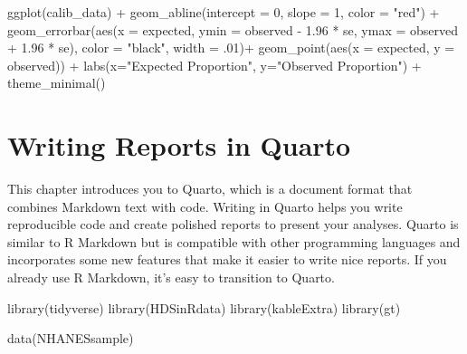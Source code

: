 \documentclass[
  letterpaper,
]{latex/krantz}
\makeatletter
\newenvironment{Shaded}{\begin{snugshade}}{\end{snugshade}}
\newcommand{\AttributeTok}[1]{\textcolor[rgb]{0.40,0.45,0.13}{#1}}
\newcommand{\DecValTok}[1]{\textcolor[rgb]{0.68,0.00,0.00}{#1}}
\newcommand{\FloatTok}[1]{\textcolor[rgb]{0.68,0.00,0.00}{#1}}
\newcommand{\FunctionTok}[1]{\textcolor[rgb]{0.28,0.35,0.67}{#1}}
\newcommand{\NormalTok}[1]{\textcolor[rgb]{0.00,0.23,0.31}{#1}}
\newcommand{\SpecialCharTok}[1]{\textcolor[rgb]{0.37,0.37,0.37}{#1}}
\newcommand{\StringTok}[1]{\textcolor[rgb]{0.13,0.47,0.30}{#1}}
\newenvironment{kframe}{%
\medskip{}
\setlength{\fboxsep}{.8em}
 \def\at@end@of@kframe{}%
 \ifinner\ifhmode%
  \def\at@end@of@kframe{\end{minipage}}%
  \begin{minipage}{\columnwidth}%
 \fi\fi%
 \def\FrameCommand##1{\hskip\@totalleftmargin \hskip-\fboxsep
 \colorbox{shadecolor}{##1}\hskip-\fboxsep
     \hskip-\linewidth \hskip-\@totalleftmargin \hskip\columnwidth}%
 \MakeFramed {\advance\hsize-\width
   \@totalleftmargin\z@ \linewidth\hsize
   \@setminipage}}%
 {\par\unskip\endMakeFramed%
 \at@end@of@kframe}
\renewenvironment{Shaded}{\begin{kframe}}{\end{kframe}}
\makeatother
\begin{document}
\begin{enumerate}
\begin{Shaded}
\begin{Highlighting}[]
\FunctionTok{ggplot}\NormalTok{(calib\_data) }\SpecialCharTok{+} 
  \FunctionTok{geom\_abline}\NormalTok{(}\AttributeTok{intercept =} \DecValTok{0}\NormalTok{, }\AttributeTok{slope =} \DecValTok{1}\NormalTok{, }\AttributeTok{color =} \StringTok{"red"}\NormalTok{) }\SpecialCharTok{+} 
  \FunctionTok{geom\_errorbar}\NormalTok{(}\FunctionTok{aes}\NormalTok{(}\AttributeTok{x =}\NormalTok{ expected, }\AttributeTok{ymin =}\NormalTok{ observed }\SpecialCharTok{{-}} \FloatTok{1.96} \SpecialCharTok{*}\NormalTok{ se, }
                \AttributeTok{ymax =}\NormalTok{ observed }\SpecialCharTok{+} \FloatTok{1.96} \SpecialCharTok{*}\NormalTok{ se), }
            \AttributeTok{color =} \StringTok{"black"}\NormalTok{, }\AttributeTok{width =}\NormalTok{ .}\DecValTok{01}\NormalTok{)}\SpecialCharTok{+}
  \FunctionTok{geom\_point}\NormalTok{(}\FunctionTok{aes}\NormalTok{(}\AttributeTok{x =}\NormalTok{ expected, }\AttributeTok{y =}\NormalTok{ observed)) }\SpecialCharTok{+}
  \FunctionTok{labs}\NormalTok{(}\AttributeTok{x=}\StringTok{"Expected Proportion"}\NormalTok{, }\AttributeTok{y=}\StringTok{"Observed Proportion"}\NormalTok{) }\SpecialCharTok{+}
  \FunctionTok{theme\_minimal}\NormalTok{()}
\end{Highlighting}
\end{Shaded}
\end{enumerate}

\chapter{Writing Reports in Quarto}\label{sec-quarto}

This chapter introduces you to Quarto, which is a document
format that combines Markdown text with code. Writing in Quarto helps
you write reproducible code and create polished reports to present your
analyses. Quarto is similar to R Markdown but is compatible with other
programming languages and incorporates some new features that make it
easier to write nice reports. If you already use R Markdown, it's easy
to transition to Quarto.

\begin{Shaded}
\begin{Highlighting}[]
\FunctionTok{library}\NormalTok{(tidyverse)}
\FunctionTok{library}\NormalTok{(HDSinRdata)}
\FunctionTok{library}\NormalTok{(kableExtra)}
\FunctionTok{library}\NormalTok{(gt)}

\FunctionTok{data}\NormalTok{(NHANESsample)}
\end{Highlighting}
\end{Shaded}
\end{document}
